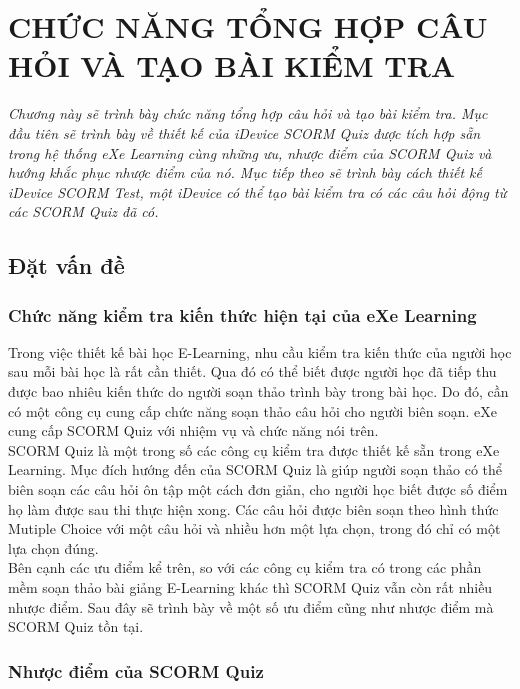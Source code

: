 \chapter{CHỨC NĂNG TỔNG HỢP CÂU HỎI VÀ TẠO BÀI KIỂM TRA}
\begin{flushleft}
	\fontsize{12pt}{7pt}\selectfont
	\textit{Chương này sẽ trình bày chức năng tổng hợp câu hỏi và tạo bài kiểm tra. Mục đầu tiên sẽ trình bày về thiết kế của iDevice SCORM Quiz được tích hợp sẵn trong hệ thống eXe Learning cùng những ưu, nhược điểm của SCORM Quiz và hướng khắc phục nhược điểm của nó. Mục tiếp theo sẽ trình bày cách thiết kế iDevice SCORM Test, một iDevice có thể tạo bài kiểm tra có các câu hỏi động từ các SCORM Quiz đã có.}
\end{flushleft}

\section{Đặt vấn đề}
\subsection{Chức năng kiểm tra kiến thức hiện tại của eXe Learning}
	Trong việc thiết kế bài học E-Learning, nhu cầu kiểm tra kiến thức của người học sau mỗi bài học là rất cần thiết. Qua đó có thể biết được người học đã tiếp thu được bao nhiêu kiến thức do người soạn thảo trình bày trong bài học. Do đó, cần có một công cụ cung cấp chức năng soạn thảo câu hỏi cho người biên soạn. eXe cung cấp SCORM Quiz với nhiệm vụ và chức năng nói trên.\\

	SCORM Quiz là một trong số các công cụ kiểm tra được thiết kế sẵn trong eXe Learning. Mục đích hướng đến của SCORM Quiz là giúp người soạn thảo có thể biên soạn các câu hỏi ôn tập một cách đơn giản, cho người học biết được số điểm họ làm được sau thi thực hiện xong. Các câu hỏi được biên soạn theo hình thức Mutiple Choice với một câu hỏi và nhiều hơn một lựa chọn, trong đó chỉ có một lựa chọn đúng.\\

	Bên cạnh các ưu điểm kể trên, so với các công cụ kiểm tra có trong các phần mềm soạn thảo bài giảng E-Learning khác thì SCORM Quiz vẫn còn rất nhiều nhược điểm. Sau đây sẽ trình bày về một số ưu điểm cũng như nhược điểm mà SCORM Quiz tồn tại.


\subsection{Nhược điểm của SCORM Quiz }

